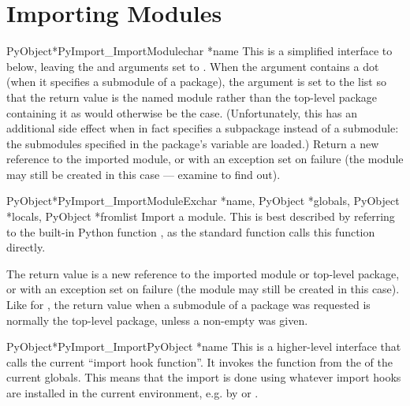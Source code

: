 \section{Importing Modules \label{importing}}

\begin{cfuncdesc}{PyObject*}{PyImport_ImportModule}{char *name}
  This is a simplified interface to
   below, leaving the
   and  arguments set to \NULL.  When the
   argument contains a dot (when it specifies a submodule of
  a package), the  argument is set to the list
  \code{['*']} so that the return value is the named module rather
  than the top-level package containing it as would otherwise be the
  case.  (Unfortunately, this has an additional side effect when
   in fact specifies a subpackage instead of a submodule:
  the submodules specified in the package's  variable
  are 
  loaded.)  Return
  a new reference to the imported module, or \NULL{} with an exception
  set on failure (the module may still be created in this case ---
  examine  to find out).
\end{cfuncdesc}

\begin{cfuncdesc}{PyObject*}{PyImport_ImportModuleEx}{char *name,
                       PyObject *globals, PyObject *locals, PyObject *fromlist}
  Import a module.  This is best described by referring to the
  built-in Python function
  , as the standard
   function calls this function directly.

  The return value is a new reference to the imported module or
  top-level package, or \NULL{} with an exception set on failure (the
  module may still be created in this case).  Like for
  , the return value when a submodule of a
  package was requested is normally the top-level package, unless a
  non-empty  was given.
\end{cfuncdesc}

\begin{cfuncdesc}{PyObject*}{PyImport_Import}{PyObject *name}
  This is a higher-level interface that calls the current ``import
  hook function''.  It invokes the  function
  from the  of the current globals.  This means
  that the import is done using whatever import hooks are installed in
  the current environment, e.g. by 
  or .
\end{cfuncdesc}

